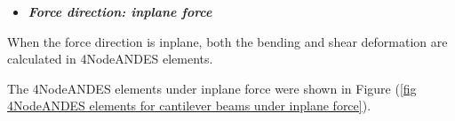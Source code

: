 \documentclass[fleqn,11pt]{article}
\begin{document}







\begin{itemize}
  \item \textbf{\emph{Force direction: inplane force }}
\end{itemize}
When the force direction is inplane, both the bending and shear deformation are calculated in 4NodeANDES elements. 


The 4NodeANDES elements under inplane force were shown in Figure (\ref{fig 4NodeANDES elements for cantilever beams under inplane force}).
\end{document}
